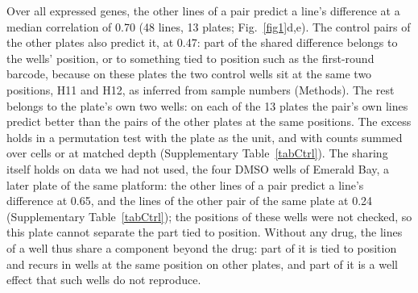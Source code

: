 \documentclass[pdflatex,sn-nature]{sn-jnl}
\begin{document}
Over all expressed genes, the other lines of a pair predict a line's difference at a median correlation of 0.70 (48 lines, 13 plates; Fig.~\ref{fig1}d,e). The control pairs of the other plates also predict it, at 0.47: part of the shared difference belongs to the wells' position, or to something tied to position such as the first-round barcode, because on these plates the two control wells sit at the same two positions, H11 and H12, as inferred from sample numbers (Methods). The rest belongs to the plate's own two wells: on each of the 13 plates the pair's own lines predict better than the pairs of the other plates at the same positions. The excess holds in a permutation test with the plate as the unit, and with counts summed over cells or at matched depth (Supplementary Table~\ref{tabCtrl}). The sharing itself holds on data we had not used, the four DMSO wells of Emerald Bay, a later plate of the same platform\cite{emeraldbay}: the other lines of a pair predict a line's difference at 0.65, and the lines of the other pair of the same plate at 0.24 (Supplementary Table~\ref{tabCtrl}); the positions of these wells were not checked, so this plate cannot separate the part tied to position. Without any drug, the lines of a well thus share a component beyond the drug: part of it is tied to position and recurs in wells at the same position on other plates, and part of it is a well effect that such wells do not reproduce.
\end{document}
